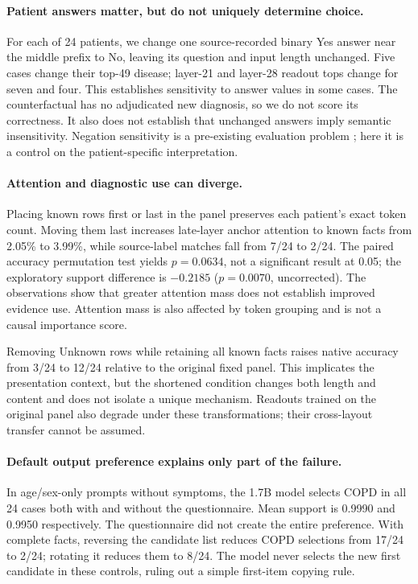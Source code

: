 \documentclass[11pt]{article}
\begin{document}
\paragraph{Patient answers matter, but do not uniquely determine choice.}
For each of 24 patients, we change one source-recorded binary Yes answer near the middle prefix to No, leaving its question and input length unchanged. Five cases change their top-49 disease; layer-21 and layer-28 readout tops change for seven and four. This establishes sensitivity to answer values in some cases. The counterfactual has no adjudicated new diagnosis, so we do not score its correctness. It also does not establish that unchanged answers imply semantic insensitivity. Negation sensitivity is a pre-existing evaluation problem \citep{negation}; here it is a control on the patient-specific interpretation.

\paragraph{Attention and diagnostic use can diverge.}
Placing known rows first or last in the panel preserves each patient's exact token count. Moving them last increases late-layer anchor attention to known facts from 2.05\% to 3.99\%, while source-label matches fall from 7/24 to 2/24. The paired accuracy permutation test yields $p=0.0634$, not a significant result at 0.05; the exploratory support difference is $-0.2185$ ($p=0.0070$, uncorrected). The observations show that greater attention mass does not establish improved evidence use. Attention mass is also affected by token grouping and is not a causal importance score.

Removing Unknown rows while retaining all known facts raises native accuracy from 3/24 to 12/24 relative to the original fixed panel. This implicates the presentation context, but the shortened condition changes both length and content and does not isolate a unique mechanism. Readouts trained on the original panel also degrade under these transformations; their cross-layout transfer cannot be assumed.

\paragraph{Default output preference explains only part of the failure.}
In age/sex-only prompts without symptoms, the 1.7B model selects COPD in all 24 cases both with and without the questionnaire. Mean support is 0.9990 and 0.9950 respectively. The questionnaire did not create the entire preference. With complete facts, reversing the candidate list reduces COPD selections from 17/24 to 2/24; rotating it reduces them to 8/24. The model never selects the new first candidate in these controls, ruling out a simple first-item copying rule.
\end{document}
